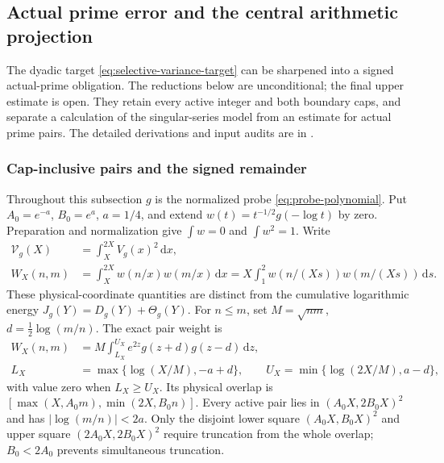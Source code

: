 \documentclass[11pt]{article}
\numberwithin{equation}{section}
\theoremstyle{definition}
\theoremstyle{remark}
\newcommand{\dd}{\,\mathrm d}
\begin{document}
\subsection{Actual prime error and the central arithmetic projection}
\label{sec:actual-arithmetic-projection}

The dyadic target \eqref{eq:selective-variance-target} can be sharpened
into a signed actual-prime obligation. The reductions below are
unconditional; the final upper estimate is open. They retain every
active integer and both boundary caps, and separate a calculation of
the singular-series model from an estimate for actual prime pairs.
The detailed derivations and input audits are in
\cite{DyadicCorrelationNotes,ActualErrorNotes}.

\subsubsection{Cap-inclusive pairs and the signed remainder}

Throughout this subsection \(g\) is the normalized probe
\eqref{eq:probe-polynomial}. Put \(A_0=e^{-a}\), \(B_0=e^a\),
\(a=1/4\), and extend \(w(t)=t^{-1/2}g(-\log t)\) by zero.
Preparation and normalization give
\(\int w=0\) and \(\int w^2=1\). Write
\begin{equation}\label{eq:actual-dyadic-energy}
\begin{aligned}
\mathcal V_g(X)&=\int_X^{2X}V_g(x)^2\dd x,\\
W_X(n,m)&=\int_X^{2X}w(n/x)w(m/x)\dd x
=X\int_1^2w(n/(Xs))w(m/(Xs))\dd s.
\end{aligned}
\end{equation}
These physical-coordinate quantities are distinct from the cumulative
logarithmic energy \(J_g(Y)=D_g(Y)+\Theta_g(Y)\).
For \(n\le m\), set \(M=\sqrt{nm}\),
\(d=\tfrac12\log(m/n)\). The exact pair weight is
\begin{equation}\label{eq:actual-pair-caps}
\begin{split}
W_X(n,m)&=M\int_{L_X}^{U_X}e^{2z}g(z+d)g(z-d)\dd z,\\
L_X&=\max\{\log(X/M),-a+d\},\qquad
U_X=\min\{\log(2X/M),a-d\},
\end{split}
\end{equation}
with value zero when \(L_X\ge U_X\). Its physical overlap is
\([\max(X,A_0m),\min(2X,B_0n)]\). Every active pair lies in
\((A_0X,2B_0X)^2\) and has \(|\log(m/n)|<2a\).
Only the disjoint lower square \((A_0X,B_0X)^2\) and upper square
\((2A_0X,2B_0X)^2\) require truncation from the whole overlap;
\(B_0<2A_0\) prevents simultaneous truncation.
\end{document}
